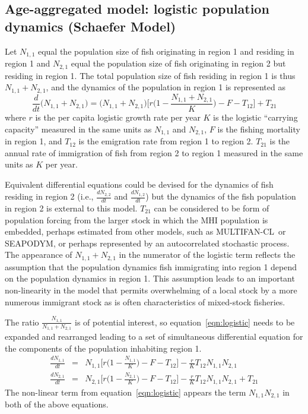 \documentclass[12pt,letterpaper]{article}
\newcommand\SD{SEAPODYM}
\newcommand\MFCL{MULTIFAN-CL}
\newcommand\help[1]{\color{Magenta}{\it #1 }\normalcolor}
\newcommand\None{{N_{1,1}}}
\newcommand\Ntwo{{N_{2,1}}}
\newcommand\Nsum{{N_{1,1}+N_{2,1}}}
\begin{document}
\clearpage
\subsection*{Age-aggregated model: logistic population dynamics (Schaefer Model)}
\help{When this project was initially proposed, I assumed that the
data would not support an age-structured model. Therefore, I began to
think about production model approaches. I'm retaining these ideas in
case the available size data are not sufficient for an multi-gear
age-structured model and because of delays in receiving data.}

Let $\None$ equal the population size of fish originating in region 1
and residing in region 1
and $\Ntwo$ equal the population size of fish originating in region 2
but residing in region 1.
The total population size of fish residing in region 1 is thus
$\Nsum$, and the dynamics of the population in region 1 is represented as
\begin{equation}
\frac{d}{dt}\big(\Nsum\big)=\big(\Nsum\big)\Big[r\Big(1-\frac{\Nsum}{K}\Big) -F - T_{12}\Big] + T_{21}
\label{eqn:logistic}
\end{equation}
where $r$ is the per capita logistic growth rate per year $K$ is the
logistic ``carrying capacity'' measured in the same units as $\None$
and $\Ntwo$, $F$ is the fishing mortality in region 1, and $T_{12}$
is the emigration rate from region 1 to region 2. $T_{21}$
is the annual rate of immigration of fish from region 2 to region 1
measured in the same units as $K$ per year.

Equivalent differential equations could be devised for the dynamics of
fish residing in region 2 (i.e., $\frac{dN_{2,2}}{dt}$ and
$\frac{dN_{1,2}}{dt}$) but 
the dynamics of the fish population in region 2 is external to this
model. $T_{21}$ can be considered to be form of population forcing
from the larger stock in which the MHI population is embedded, perhaps
estimated from other models, such as \MFCL\ or \SD, or perhaps
represented by an
autocorrelated stochastic process. The appearance of
$\Nsum$ in the numerator of the logistic term reflects the assumption
that the population dynamics fish immigrating into region 1 depend on
the population dynamics in region 1. This assumption leads to an
important non-linearity in the model that permits overwhelming of a
local stock by a more numerous immigrant stock as is often characteristics of
mixed-stock fisheries.

The ratio $\frac{\None}{\Nsum}$ is of potential interest, so
equation~\ref{eqn:logistic} needs to be expanded and rearranged
leading to a set of simultaneous differential equation for the
components of the population inhabiting region 1.
\begin{eqnarray}
\frac{d\None}{dt}&=&\None\Big[r\Big(1-\frac{\None}{K}\Big)
-F - T_{12}\Big] - \frac{r}{K}T_{12}\None\Ntwo\nonumber\\
\frac{d\Ntwo}{dt}&=&\Ntwo\Big[r\Big(1-\frac{\Ntwo}{K}\Big)
-F - T_{12}\Big] - \frac{r}{K}T_{12}\None\Ntwo + T_{21}
\label{eqn:coupledschaefer}
\end{eqnarray}
The non-linear term from equation~\ref{eqn:logistic} appears the term
$\None\Ntwo$ in both of the above equations.
\end{document}
